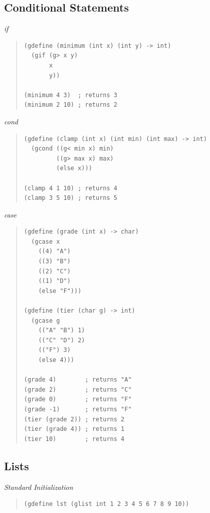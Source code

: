 \documentclass{article}
\begin{document}
\subsection{Conditional Statements}

\raggedright{}{
{\emph{if}}
}
\begin{quote}
\begin{verbatim}
(gdefine (minimum (int x) (int y) -> int)
  (gif (g> x y)
       x
       y))

(minimum 4 3)  ; returns 3
(minimum 2 10) ; returns 2

\end{verbatim}
\end{quote}

\raggedright{}{
{\emph{cond}}
}
\begin{quote}
\begin{verbatim}
(gdefine (clamp (int x) (int min) (int max) -> int)
  (gcond ((g< min x) min)
         ((g> max x) max)
         (else x)))

(clamp 4 1 10) ; returns 4
(clamp 3 5 10) ; returns 5

\end{verbatim}
\end{quote}

\raggedright{}{
{\emph{case}}
}
\begin{quote}
\begin{verbatim}
(gdefine (grade (int x) -> char)
  (gcase x
    ((4) "A")
    ((3) "B")
    ((2) "C")
    ((1) "D")
    (else "F")))

(gdefine (tier (char g) -> int)
  (gcase g
    (("A" "B") 1)
    (("C" "D") 2)
    (("F") 3)
    (else 4)))

(grade 4)        ; returns "A"
(grade 2)        ; returns "C"
(grade 0)        ; returns "F"
(grade -1)       ; returns "F"
(tier (grade 2)) ; returns 2
(tier (grade 4)) ; returns 1
(tier 10)        ; returns 4

\end{verbatim}
\end{quote}

\subsection{Lists}
\raggedright{} {
{\emph{Standard Initialization}}
}

\begin{quote}
\begin{verbatim}
(gdefine lst (glist int 1 2 3 4 5 6 7 8 9 10))
\end{verbatim}
\end{quote}
\end{document}
